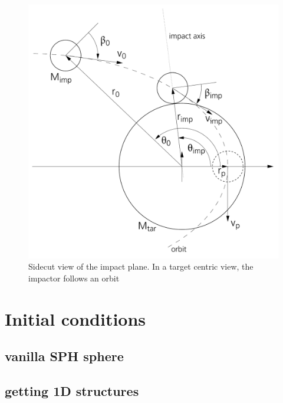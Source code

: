 \begin{figure}[htbp]
\begin{center}
\includegraphics[scale=0.6]{29ssc.pdf}
\caption{Sidecut view of the impact plane. In a target centric view, the impactor follows an orbit }
\label{ch02_fig29}
\end{center}
\end{figure}




\cite{amd64:2006}





\section{Initial conditions}
\subsection{vanilla SPH sphere}
\subsection{getting 1D structures}
\label{ch01_sec99}
\citep{Benz:1991p700}

